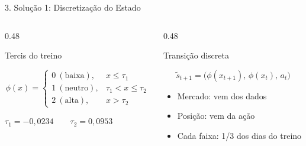 \documentclass[aspectratio=169,10pt,t]{beamer}
\newenvironment{altura}[2][c]{\begin{minipage}[t][#2][#1]{\linewidth}}{\end{minipage}}
\begin{document}

\begin{frame}{3. Solução 1: Discretização do Estado}

  \begin{columns}[T,onlytextwidth]
    \begin{column}{0.48\textwidth}
      \begin{block}{Tercis do treino}
        \begin{altura}{2.35cm}
        \[
          \phi(x) =
            \begin{cases}
              0 \ (\text{baixa}),  & x \le \tau_1 \\
              1 \ (\text{neutro}), & \tau_1 < x \le \tau_2 \\
              2 \ (\text{alta}),   & x > \tau_2
            \end{cases}
        \]
        {\centering\footnotesize $\tau_1 = -0{,}0234 \qquad \tau_2 = 0{,}0953$\par}
        \end{altura}
      \end{block}
    \end{column}

    \begin{column}{0.48\textwidth}
      \begin{block}{Transição discreta}
        \begin{altura}{2.35cm}
        \[
          \tilde{s}_{t+1} = \big(\phi(x_{t+1}),\, \phi(x_t),\, a_t\big)
        \]
        \footnotesize
        \begin{itemize}\setlength{\itemsep}{2pt}
          \item Mercado: vem dos dados
          \item Posição: vem da ação
          \item Cada faixa: 1/3 dos dias do treino
        \end{itemize}
        \end{altura}
      \end{block}
    \end{column}
  \end{columns}


\end{frame}
\end{document}
